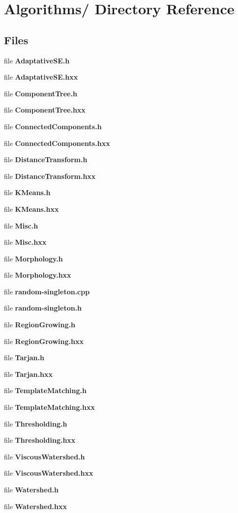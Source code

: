 \section{Algorithms/ Directory Reference}
\label{dir_000000}
\subsection*{Files}
\begin{CompactItemize}
\item 
file {\bf Adaptative\-SE.h}
\item 
file {\bf Adaptative\-SE.hxx}
\item 
file {\bf Component\-Tree.h}
\item 
file {\bf Component\-Tree.hxx}
\item 
file {\bf Connected\-Components.h}
\item 
file {\bf Connected\-Components.hxx}
\item 
file {\bf Distance\-Transform.h}
\item 
file {\bf Distance\-Transform.hxx}
\item 
file {\bf KMeans.h}
\item 
file {\bf KMeans.hxx}
\item 
file {\bf Misc.h}
\item 
file {\bf Misc.hxx}
\item 
file {\bf Morphology.h}
\item 
file {\bf Morphology.hxx}
\item 
file {\bf random-singleton.cpp}
\item 
file {\bf random-singleton.h}
\item 
file {\bf Region\-Growing.h}
\item 
file {\bf Region\-Growing.hxx}
\item 
file {\bf Tarjan.h}
\item 
file {\bf Tarjan.hxx}
\item 
file {\bf Template\-Matching.h}
\item 
file {\bf Template\-Matching.hxx}
\item 
file {\bf Thresholding.h}
\item 
file {\bf Thresholding.hxx}
\item 
file {\bf Viscous\-Watershed.h}
\item 
file {\bf Viscous\-Watershed.hxx}
\item 
file {\bf Watershed.h}
\item 
file {\bf Watershed.hxx}
\end{CompactItemize}
